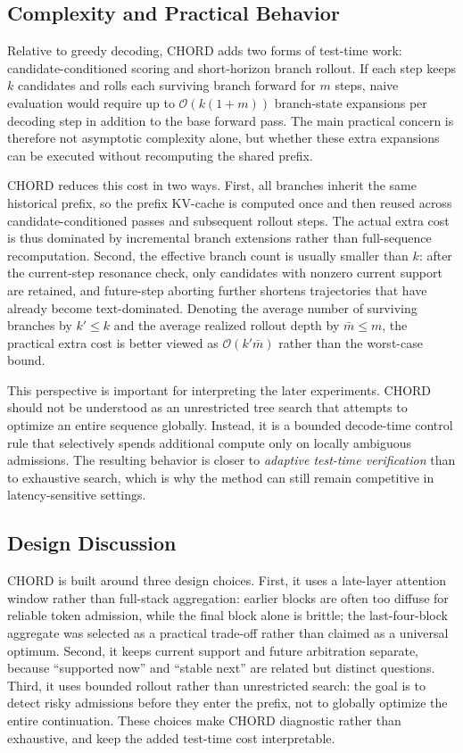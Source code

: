 \documentclass[sigconf,anonymous]{acmart}
\begin{document}
\subsection{Complexity and Practical Behavior}
\label{sec:complexity}

Relative to greedy decoding, CHORD adds two forms of test-time work: candidate-conditioned scoring and short-horizon branch rollout. If each step keeps $k$ candidates and rolls each surviving branch forward for $m$ steps, naive evaluation would require up to $\mathcal{O}(k(1+m))$ branch-state expansions per decoding step in addition to the base forward pass. The main practical concern is therefore not asymptotic complexity alone, but whether these extra expansions can be executed without recomputing the shared prefix.

CHORD reduces this cost in two ways. First, all branches inherit the same historical prefix, so the prefix KV-cache is computed once and then reused across candidate-conditioned passes and subsequent rollout steps. The actual extra cost is thus dominated by incremental branch extensions rather than full-sequence recomputation. Second, the effective branch count is usually smaller than $k$: after the current-step resonance check, only candidates with nonzero current support are retained, and future-step aborting further shortens trajectories that have already become text-dominated. Denoting the average number of surviving branches by $k' \le k$ and the average realized rollout depth by $\bar{m} \le m$, the practical extra cost is better viewed as $\mathcal{O}(k' \bar{m})$ rather than the worst-case bound.

This perspective is important for interpreting the later experiments. CHORD should not be understood as an unrestricted tree search that attempts to optimize an entire sequence globally. Instead, it is a bounded decode-time control rule that selectively spends additional compute only on locally ambiguous admissions. The resulting behavior is closer to \emph{adaptive test-time verification} than to exhaustive search, which is why the method can still remain competitive in latency-sensitive settings.

\subsection{Design Discussion}

CHORD is built around three design choices. First, it uses a late-layer attention window rather than full-stack aggregation: earlier blocks are often too diffuse for reliable token admission, while the final block alone is brittle; the last-four-block aggregate was selected as a practical trade-off rather than claimed as a universal optimum. Second, it keeps current support and future arbitration separate, because ``supported now'' and ``stable next'' are related but distinct questions. Third, it uses bounded rollout rather than unrestricted search: the goal is to detect risky admissions before they enter the prefix, not to globally optimize the entire continuation. These choices make CHORD diagnostic rather than exhaustive, and keep the added test-time cost interpretable.
\end{document}
